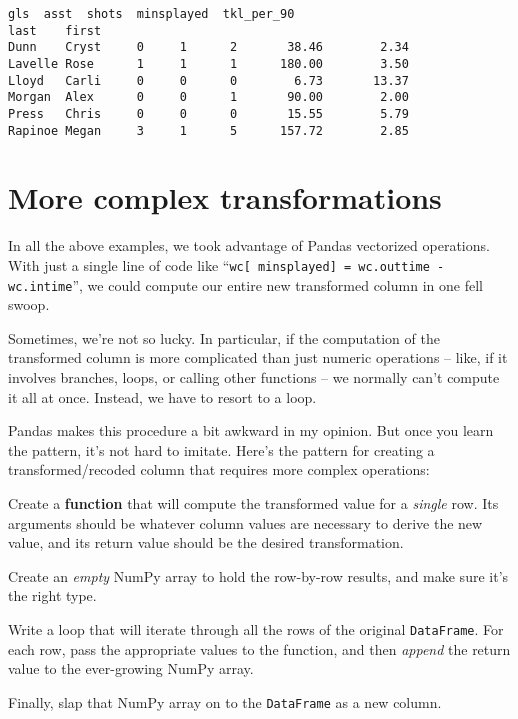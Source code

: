 \begin{Verbatim}[fontsize=\small,samepage=true,frame=leftline,framesep=5mm,framerule=1mm]
                gls  asst  shots  minsplayed  tkl_per_90
last    first                                                
Dunn    Cryst     0     1      2       38.46        2.34
Lavelle Rose      1     1      1      180.00        3.50
Lloyd   Carli     0     0      0        6.73       13.37
Morgan  Alex      0     0      1       90.00        2.00
Press   Chris     0     0      0       15.55        5.79
Rapinoe Megan     3     1      5      157.72        2.85
\end{Verbatim}

\section{More complex transformations}


In all the above examples, we took advantage of Pandas vectorized operations.
With just a single line of code like ``\texttt{wc[\textquotesingle
minsplayed\textquotesingle] = wc.outtime - wc.intime}'', we could compute
our entire new transformed column in one fell swoop.


Sometimes, we're not so lucky. In particular, if the computation of the
transformed column is more complicated than just numeric operations -- like, if
it involves branches, loops, or calling other functions -- we normally can't
compute it all at once. Instead, we have to resort to a loop.

Pandas makes this procedure a bit awkward in my opinion. But once you learn the
pattern, it's not hard to imitate. Here's the pattern for creating a
transformed/recoded column that requires more complex operations:

\begin{shaded}
\begin{compactenum}
\item Create a \textbf{function} that will compute the transformed value for a
\textit{single} row. Its arguments should be whatever column values are
necessary to derive the new value, and its return value should be the desired
transformation.
\item Create an \textit{empty} NumPy array to hold the row-by-row results, and
make sure it's the right type.
\item Write a loop that will iterate through all the rows of the original
\texttt{DataFrame}. For each row, pass the appropriate values to the function,
and then \textit{append} the return value to the ever-growing NumPy array.
\item Finally, slap that NumPy array on to the \texttt{DataFrame} as a new
column.
\end{compactenum}

\end{shaded}

